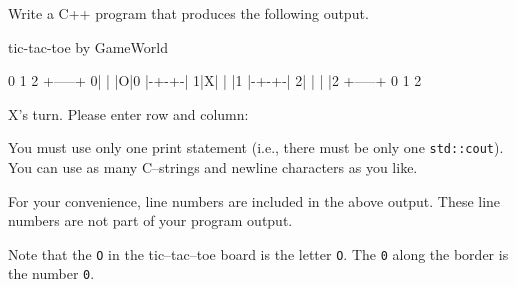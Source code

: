 Write a C++ program that produces the following output. 
\begin{console}[numbers=left]
tic-tac-toe
by GameWorld

  0 1 2
 +-----+
0| | |O|0
 |-+-+-|
1|X| | |1
 |-+-+-|
2| | | |2
 +-----+
  0 1 2

X's turn. Please enter row and column:

\end{console}
You must use only one print statement 
(i.e., there must be only one \verb!std::cout!). 
You can use as many C--strings and newline characters as you like.

For your convenience, line numbers are included in the above output.
These line numbers are not part of your program output.

Note that the \verb!O! in the tic--tac--toe board is the letter \verb!O!. 
The \verb!0! along the border is the number \verb!0!.

